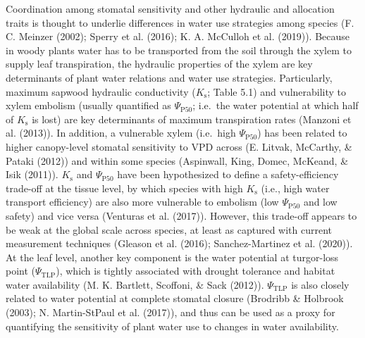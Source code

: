 \documentclass[11pt,twoside]{reedthesis}
\begin{document}
Coordination among stomatal sensitivity and other hydraulic and
allocation traits is thought to underlie differences in water use
strategies among species (F. C. Meinzer (2002); Sperry et al. (2016); K.
A. McCulloh et al. (2019)). Because in woody plants water has to be
transported from the soil through the xylem to supply leaf
transpiration, the hydraulic properties of the xylem are key
determinants of plant water relations and water use strategies.
Particularly, maximum sapwood hydraulic conductivity (\(K_\text{s}\);
Table 5.1) and vulnerability to xylem embolism (usually quantified as
\(\Psi_{\text{P50}}\); i.e.~the water potential at which half of
\(K_\text{s}\) is lost) are key determinants of maximum transpiration
rates (Manzoni et al. (2013)). In addition, a vulnerable xylem
(i.e.~high \textbar{}\(\Psi_{\text{P50}}\)\textbar{}) has been related
to higher canopy-level stomatal sensitivity to VPD across (E. Litvak,
McCarthy, \& Pataki (2012)) and within some species (Aspinwall, King,
Domec, McKeand, \& Isik (2011)). \(K_\text{s}\) and
\(\Psi_{\text{P50}}\) have been hypothesized to define a
safety-efficiency trade-off at the tissue level, by which species with
high \(K_\text{s}\) (i.e., high water transport efficiency) are also
more vulnerable to embolism (low
\textbar{}\(\Psi_{\text{P50}}\)\textbar{} and low safety) and vice versa
(Venturas et al. (2017)). However, this trade-off appears to be weak at
the global scale across species, at least as captured with current
measurement techniques (Gleason et al. (2016); Sanchez-Martinez et al.
(2020)). At the leaf level, another key component is the water potential
at turgor-loss point (\(\Psi_{\text{TLP}}\)), which is tightly
associated with drought tolerance and habitat water availability (M. K.
Bartlett, Scoffoni, \& Sack (2012)). \(\Psi_{\text{TLP}}\) is also
closely related to water potential at complete stomatal closure
(Brodribb \& Holbrook (2003); N. Martin-StPaul et al. (2017)), and thus
can be used as a proxy for quantifying the sensitivity of plant water
use to changes in water availability.\par
\end{document}

